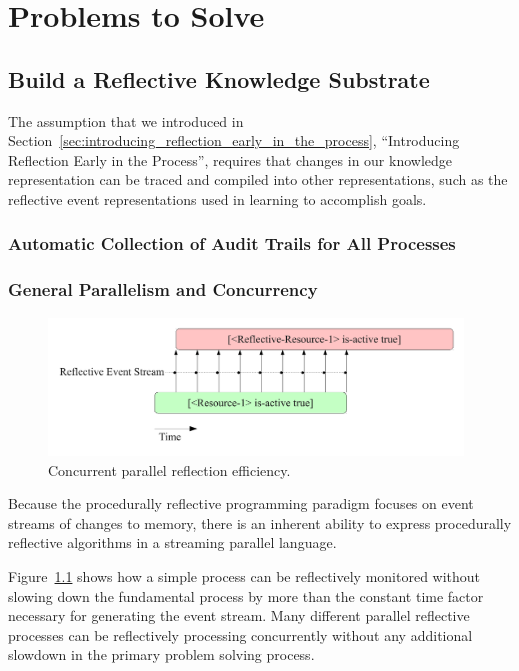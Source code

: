 \chapter{Problems to Solve}\label{ch:problems_to_solve}

\section{Build a Reflective Knowledge Substrate}

The assumption that we introduced in
Section~\ref{sec:introducing_reflection_early_in_the_process},
``Introducing Reflection Early in the Process'', requires that changes
in our knowledge representation can be traced and compiled into other
representations, such as the reflective event representations used in
learning to accomplish goals.

\subsection{Automatic Collection of Audit Trails for All Processes}




\subsection{General Parallelism and Concurrency}

\begin{figure}[bth]
  \center
  \includegraphics[width=11cm]{gfx/concurrent_parallel_reflection_efficiency}
  \caption[Concurrent parallel reflection efficiency]{Concurrent parallel reflection efficiency.}
  \label{fig:concurrent_parallel_reflection_efficiency}
\end{figure}

Because the procedurally reflective programming paradigm focuses on
event streams of changes to memory, there is an inherent ability to
express procedurally reflective algorithms in a streaming parallel
language.

Figure~\ref{fig:concurrent_parallel_reflection_efficiency} shows how a
simple process can be reflectively monitored without slowing down the
fundamental process by more than the constant time factor necessary
for generating the event stream.  Many different parallel reflective
processes can be reflectively processing concurrently without any
additional slowdown in the primary problem solving process.


